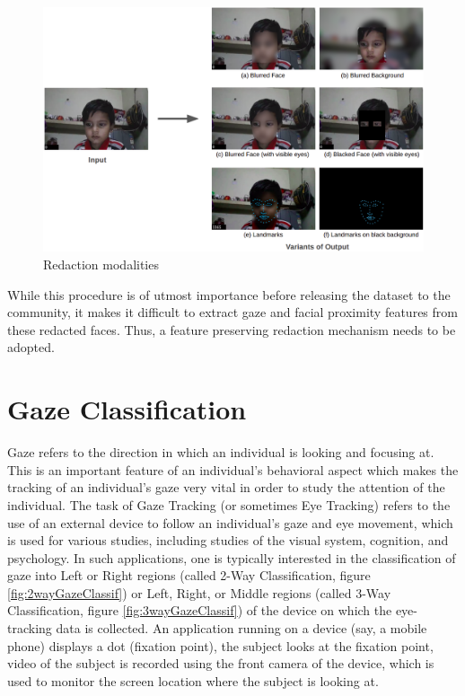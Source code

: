 \begin{figure}[tbp]
  \centering
    \includegraphics[width=1.0\textwidth]{Introduction/FaceRedactionModalities}
    \caption[Redaction Modalities]{Redaction modalities}
    \label{fig:faceRedactModes} 
\end{figure}

While this procedure is of utmost importance before releasing the dataset to the community, it makes it difficult to extract gaze and facial proximity features from these redacted faces. Thus, a feature preserving redaction mechanism needs to be adopted.


\section{Gaze Classification}
Gaze refers to the direction in which an individual is looking and focusing at. This is an important feature of an individual's behavioral aspect which makes the tracking of an individual's gaze very vital in order to study the attention of the individual. The task of Gaze Tracking (or sometimes Eye Tracking) refers to the use of an external device to follow an individual’s gaze and eye movement, which is used for various studies, including studies of the visual system, cognition, and psychology. In such applications, one is typically interested in the classification of gaze into Left or Right regions (called 2-Way Classification, figure \ref{fig:2wayGazeClassif}) or Left, Right, or Middle regions (called 3-Way Classification, figure \ref{fig:3wayGazeClassif}) of the device on which the eye-tracking data is collected. An application running on a device (say, a mobile phone) displays a dot (fixation point), the subject looks at the fixation point, video of the subject is recorded using the front camera of the device, which is used to monitor the screen location where the subject is looking at.\\


